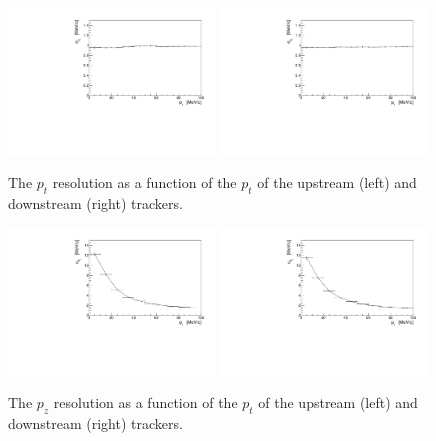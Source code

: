   \begin{figure}[p]
   \begin{center}
     \includegraphics[width=0.49\textwidth, angle=0]{08-Performance/upstream_pt_resolution_pt.pdf}
     \includegraphics[width=0.49\textwidth, angle=0]{08-Performance/downstream_pt_resolution_pt.pdf}
     \caption{\label{fig:PtPtResolKalman} The $p_{t}$ resolution as a function of the $p_{t}$ of the upstream (left) and downstream (right) trackers.}
   \end{center}
  \end{figure}
  
  \begin{figure}[p]
   \begin{center}
     \includegraphics[width=0.49\textwidth, angle=0]{08-Performance/upstream_pz_resolution_pt.pdf}
     \includegraphics[width=0.49\textwidth, angle=0]{08-Performance/downstream_pz_resolution_pt.pdf}
     \caption{\label{fig:PtPzResolKalman} The $p_z$ resolution as a function of the $p_{t}$ of the upstream (left) and downstream (right) trackers.}
   \end{center}
  \end{figure}

